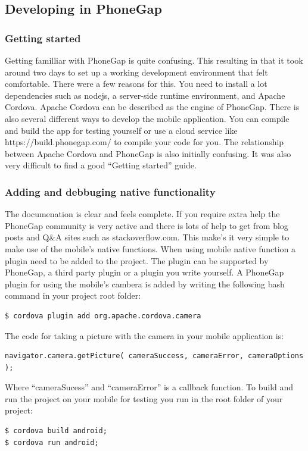 \documentclass{cslthse-msc}
\begin{document}
\subsection{Developing in PhoneGap}
\subsubsection{Getting started}
Getting familliar with PhoneGap is quite confusing. This resulting in that it took around two days to set up a working development environment that felt comfortable. There were a few reasons for this. You need to install a lot dependencies such as nodejs, a server-side runtime environment, and Apache Cordova. Apache Cordova can be described as the engine of PhoneGap. There is also several different ways to develop the mobile application. You can compile and build the app for testing yourself or use a cloud service like https://build.phonegap.com/ to compile your code for you. The relationship between Apache Cordova and PhoneGap is also initially confusing. It was also very difficult to find a good “Getting started” guide.

\subsubsection{Adding and debbuging native functionality}
The documenation is clear and feels complete. If you require extra help the PhoneGap community is very active and there is lots of help to get from blog posts and Q\&A sites such as stackoverflow.com. This make’s it very simple to make use of the mobile’s native functions. 
\newline
\newline
When using mobile native function a plugin need to be added to the project. The plugin can be supported by PhoneGap, a third party plugin or a plugin you write yourself. A PhoneGap plugin for using the mobile’s cambera is added by writing the following bash command in your project root folder:
\begin{verbatim}
$ cordova plugin add org.apache.cordova.camera
\end{verbatim}
The code for taking a picture with the camera in your mobile application is:
\begin{verbatim}
navigator.camera.getPicture( cameraSuccess, cameraError, cameraOptions );
\end{verbatim}
Where “cameraSucess” and “cameraError” is a callback function. 
\newline
\newline
To build and run the project on your mobile for testing you run in the root folder of your project:
\begin{verbatim}
$ cordova build android; 
$ cordova run android;
\end{verbatim}
\end{document}
